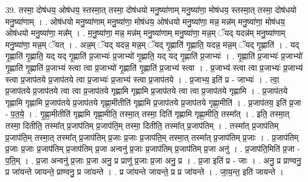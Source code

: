 \documentclass[17pt]{extarticle}
\begin{document}
39. तस्मा॒ दोष॑धय॒ ओष॑धय॒ स्तस्मा॒त् तस्मा॒ दोष॑धयो मनु॒ष्या॑णाम् मनु॒ष्या॑णा॒ मोष॑धय॒ स्तस्मा॒त् तस्मा॒ दोष॑धयो मनु॒ष्या॑णाम् । . ओष॑धयो मनु॒ष्या॑णाम् मनु॒ष्या॑णा॒ मोष॑धय॒ ओष॑धयो मनु॒ष्या॑णा॒ मन्न॒ मन्न॑म् मनु॒ष्या॑णा॒ मोष॑धय॒ ओष॑धयो मनु॒ष्या॑णा॒ मन्न᳚म् । . म॒नु॒ष्या॑णा॒ मन्न॒ मन्न॑म् मनु॒ष्या॑णाम् मनु॒ष्या॑णा॒ मन्न॒म् ॅयद् यदन्न॑म् मनु॒ष्या॑णाम् मनु॒ष्या॑णा॒ मन्न॒म् ॅयत् । . अन्न॒म् ॅयद् यदन्न॒ मन्न॒म् ॅयद् गृ॒ह्णाति॑ गृ॒ह्णाति॒ यदन्न॒ मन्न॒म् ॅयद् गृ॒ह्णाति॑ । . यद् गृ॒ह्णाति॑ गृ॒ह्णाति॒ यद् यद् गृ॒ह्णाति॑ प्र॒जाभ्यः॑ प्र॒जाभ्यो॑ गृ॒ह्णाति॒ यद् यद् गृ॒ह्णाति॑ प्र॒जाभ्यः॑ । . गृ॒ह्णाति॑ प्र॒जाभ्यः॑ प्र॒जाभ्यो॑ गृ॒ह्णाति॑ गृ॒ह्णाति॑ प्र॒जाभ्य॑ स्त्वा त्वा प्र॒जाभ्यो॑ गृ॒ह्णाति॑ गृ॒ह्णाति॑ प्र॒जाभ्य॑ स्त्वा । . प्र॒जाभ्य॑ स्त्वा त्वा प्र॒जाभ्यः॑ प्र॒जाभ्य॑ स्त्वा प्र॒जाप॑तये प्र॒जाप॑तये त्वा प्र॒जाभ्यः॑ प्र॒जाभ्य॑ स्त्वा प्र॒जाप॑तये । . प्र॒जाभ्य॒ इति॑ प्र - जाभ्यः॑ । . त्वा॒ प्र॒जाप॑तये प्र॒जाप॑तये त्वा त्वा प्र॒जाप॑तये गृह्णामि गृह्णामि प्र॒जाप॑तये त्वा त्वा प्र॒जाप॑तये गृह्णामि । . प्र॒जाप॑तये गृह्णामि गृह्णामि प्र॒जाप॑तये प्र॒जाप॑तये गृह्णा॒मीतीति॑ गृह्णामि प्र॒जाप॑तये प्र॒जाप॑तये गृह्णा॒मीति॑ । . प्र॒जाप॑तय॒ इति॑ प्र॒जा - प॒त॒ये॒ । . गृ॒ह्णा॒मीतीति॑ गृह्णामि गृह्णा॒मीति॒ तस्मा॒त् तस्मा॒ दिति॑ गृह्णामि गृह्णा॒मीति॒ तस्मा᳚त् । . इति॒ तस्मा॒त् तस्मा॒ दितीति॒ तस्मा᳚त् प्र॒जाप॑तिम् प्र॒जाप॑ति॒म् तस्मा॒ दितीति॒ तस्मा᳚त् प्र॒जाप॑तिम् । . तस्मा᳚त् प्र॒जाप॑तिम् प्र॒जाप॑ति॒म् तस्मा॒त् तस्मा᳚त् प्र॒जाप॑तिम् प्र॒जाः प्र॒जाः प्र॒जाप॑ति॒म् तस्मा॒त् तस्मा᳚त् प्र॒जाप॑तिम् प्र॒जाः । . प्र॒जाप॑तिम् प्र॒जाः प्र॒जाः प्र॒जाप॑तिम् प्र॒जाप॑तिम् प्र॒जा अन्वनु॑ प्र॒जाः प्र॒जाप॑तिम् प्र॒जाप॑तिम् प्र॒जा अनु॑ । . प्र॒जाप॑ति॒मिति॑ प्र॒जा - प॒ति॒म् । . प्र॒जा अन्वनु॑ प्र॒जाः प्र॒जा अनु॒ प्र प्राणु॑ प्र॒जाः प्र॒जा अनु॒ प्र । . प्र॒जा इति॑ प्र - जाः । . अनु॒ प्र प्राण्वनु॒ प्र जा॑यन्ते जायन्ते॒ प्राण्वनु॒ प्र जा॑यन्ते । . प्र जा॑यन्ते जायन्ते॒ प्र प्र जा॑यन्ते । . जा॒य॒न्त॒ इति॑ जायन्ते । \newline
\pagebreak
{}
\end{document}
